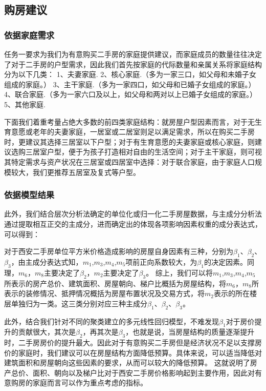 \documentclass[withoutpreface,bwprint]{cumcmthesis} %
\begin{document}
\subsection{购房建议}
\subsubsection{依据家庭需求}
任务一要求为我们为有意购买二手房的家庭提供建议，而家庭成员的数量往往决定了对于二手房的户型需求，因此我们首先按家庭的代际数量和亲属关系将家庭结构分为以下几类：
1、夫妻家庭.
2、核心家庭.（多为一家三口，如父母和未婚子女组成的家庭。）
3、主干家庭.（多为一家四口，如父母和已婚子女组成的家庭。）
4、联合家庭.（多为一家六口及以上，如父母和两对以上已婚子女组成的家庭。）
5、其他家庭.

下面我们着重考量占绝大多数的前四类家庭结构：就房屋户型因素而言，对于无生育意愿或老年的夫妻家庭，一居室或二居室则足以满足需求，所以在购买二手房时，更建议其选择三居室以下户型；对于有生育意愿的夫妻家庭或核心家庭，则建议选购三居室户型，便于为孩子打造相对自由的生活空间；对于主干家庭，则可视其特定需求与资产状况在三居室或四居室中选择：对于联合家庭，由于家庭人口规模较大，我们更推荐五居室及复式等户型。
\subsubsection{依据模型结果}
此外，我们结合层次分析法确定的单位化或归一化二手房屋数据，与主成分分析法通过提取相互正交的主成分，进而确定出的体现各项影响因素权重的成分表达式，可以得到：

对于西安二手房单位平方米价格造成影响的房屋自身因素有三种，分别为$\beta_{1}$、$\beta_{2}$、$\beta_{3}$，由主成分表达式知，$m_1$,$m_3$,$m_4$,$m_5$项前正向系数较大，为$\beta_{1}$的决定因素。同理，$m_6$，$m_8$主要决定了$\beta_{2}$，$m_2$主要决定了$\beta_{3}$。
综上，我们可以将$m_1$,$m_3$,$m_4$,$m_5$所表示的房产总价、建筑面积、房屋朝向、梯户比概括为房屋结构，将$m_6$，$m_8$所表示的装修情况、抵押情况概括为房屋布置状况及交易方式，将$m_2$表示的所在楼层单独归为一类。这三类分别对应三种主成分$\beta_{1}$、$\beta_{2}$、$\beta_{3}$。

此外，结合我们针对不同的聚类建立的多元线性回归模型，不难发现$\beta_1$对于房价提升的贡献很大，其次是$\beta_2$，再其次是$\beta_3$，也就是说，当房屋结构的质量逐渐提升时，二手房房价的提升最大。因此对于有意购买二手房但是经济状况不足以支撑房价的家庭时，我们建议可以在房屋结构方面降低预算。具体来说，可以适当降低对建筑面积和房屋朝向这些因素的要求，从而可以较大的降低预算。
这就说明了房产总价、面积、朝向以及梯户比对于西安二手房价格影响起到主要作用，因此对有意购房的家庭而言可以作为重点考虑的指标。
\end{document}

